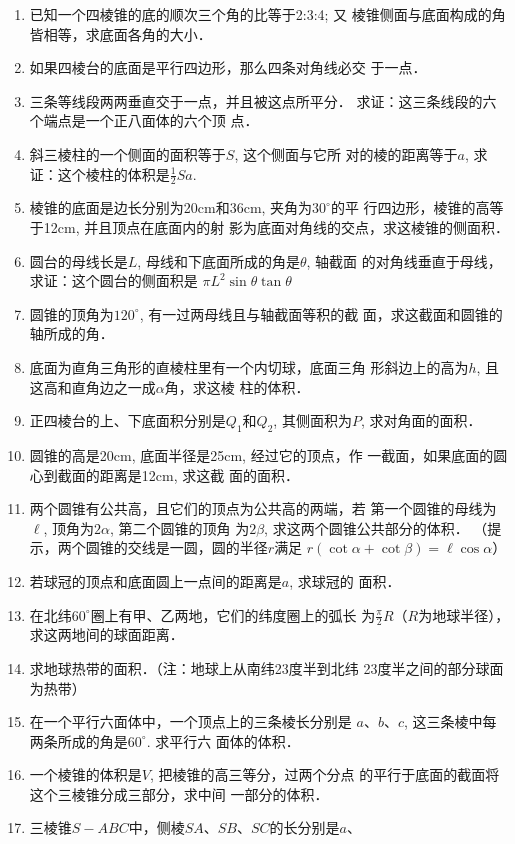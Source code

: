 \begin{enumerate}
\item 已知一个四棱锥的底的顺次三个角的比等于2:3:4; 又
棱锥侧面与底面构成的角皆相等，求底面各角的大小．
\item 如果四棱台的底面是平行四边形，那么四条对角线必交
于一点．
\item 三条等线段两两垂直交于一点，并且被这点所平分．
求证：这三条线段的六个端点是一个正八面体的六个顶
点．
\item 斜三棱柱的一个侧面的面积等于$S$, 这个侧面与它所
对的棱的距离等于$a$, 求证：这个棱柱的体积是$\frac{1}{2}Sa$.
\item 棱锥的底面是边长分别为20cm和36cm, 夹角为$30^{\circ}$的平
行四边形，棱锥的高等于12cm, 并且顶点在底面内的射
影为底面对角线的交点，求这棱锥的侧面积．
\item 圆台的母线长是$L$, 母线和下底面所成的角是$\theta$, 轴截面
的对角线垂直于母线，求证：这个圆台的侧面积是
$\pi L^2\sin\theta \tan\theta$
\item 圆锥的顶角为$120^{\circ}$, 有一过两母线且与轴截面等积的截
面，求这截面和圆锥的轴所成的角．
\item 底面为直角三角形的直棱柱里有一个内切球，底面三角
形斜边上的高为$h$, 且这高和直角边之一成$\alpha$角，求这棱
柱的体积．
\item 正四棱台的上、下底面积分别是$Q_1$和$Q_2$, 其侧面积为$P$, 
求对角面的面积．
\item 圆锥的高是20cm, 底面半径是25cm, 经过它的顶点，作
一截面，如果底面的圆心到截面的距离是12cm, 求这截
面的面积．
\item 两个圆锥有公共高，且它们的顶点为公共高的两端，若
第一个圆锥的母线为$\ell$, 顶角为$2\alpha$, 第二个圆锥的顶角
为$2\beta$, 求这两个圆锥公共部分的体积．
（提示，两个圆锥的交线是一圆，圆的半径$r$满足
$r(\cot\alpha+\cot\beta)=\ell\cos\alpha$）
\item 若球冠的顶点和底面圆上一点间的距离是$a$, 求球冠的
面积．
\item 在北纬$60^{\circ}$圈上有甲、乙两地，它们的纬度圈上的弧长
为$\frac{\pi}{2}R$（$R$为地球半径），求这两地间的球面距离．
\item 求地球热带的面积．（注：地球上从南纬23度半到北纬
23度半之间的部分球面为热带）
\item 在一个平行六面体中，一个顶点上的三条棱长分别是
$a$、$b$、$c$, 这三条棱中每两条所成的角是$60^{\circ}$. 求平行六
面体的体积．
\item 一个棱锥的体积是$V$, 把棱锥的高三等分，过两个分点
的平行于底面的截面将这个三棱锥分成三部分，求中间
一部分的体积．
\item 三棱锥$S-ABC$中，侧棱$SA$、$SB$、$SC$的长分别是$a$、

\end{enumerate}
